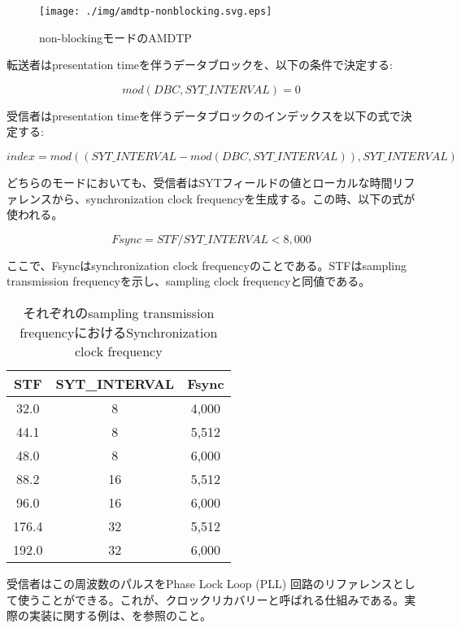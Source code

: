 \documentclass[onecolumn]{jarticle}
\begin{document}
\begin{figure}[H]
	\centering
	\texttt{[image: ./img/amdtp-nonblocking.svg.eps]}
	\caption{{non-blockingモードのAMDTP}}
	\label{amdtp-nonblockingstart}
\end{figure}

転送者はpresentation timeを伴うデータブロックを、以下の条件で決定する:

\begin{equation}
	mod(DBC, SYT\_INTERVAL) = 0
\end{equation}

受信者はpresentation timeを伴うデータブロックのインデックスを以下の式で決定する:

\begin{equation}
	index = mod((SYT\_INTERVAL - mod(DBC, SYT\_INTERVAL)), SYT\_INTERVAL)
\end{equation}

どちらのモードにおいても、受信者はSYTフィールドの値とローカルな時間リファレンスから、synchronization clock frequencyを生成する。この時、以下の式が使われる。

\begin{equation}
	Fsync = STF / SYT\_INTERVAL < 8,000
\end{equation}

ここで、Fsyncはsynchronization clock frequencyのことである。STFはsampling transmission frequencyを示し、sampling clock frequencyと同値である。

\begin{table}[H]
	\centering
	\caption{{それぞれのsampling transmission frequencyにおけるSynchronization clock frequency}}
	\label{fsync}
	\begin{tabular}{ccc} \toprule
		STF & SYT\_INTERVAL & Fsync \\ \midrule
		32.0	& 8	& 4,000 \\
		44.1	& 8	& 5,512 \\
		48.0	& 8	& 6,000 \\
		88.2	& 16	& 5,512 \\
		96.0	& 16	& 6,000 \\
		176.4	& 32	& 5,512 \\
		192.0	& 32	& 6,000 \\ \bottomrule
	\end{tabular}
\end{table}

受信者はこの周波数のパルスをPhase Lock Loop (PLL) 回路のリファレンスとして使うことができる。これが、クロックリカバリーと呼ばれる仕組みである。実際の実装に関する例は、\cite{icelynx}を参照のこと。
\end{document}
